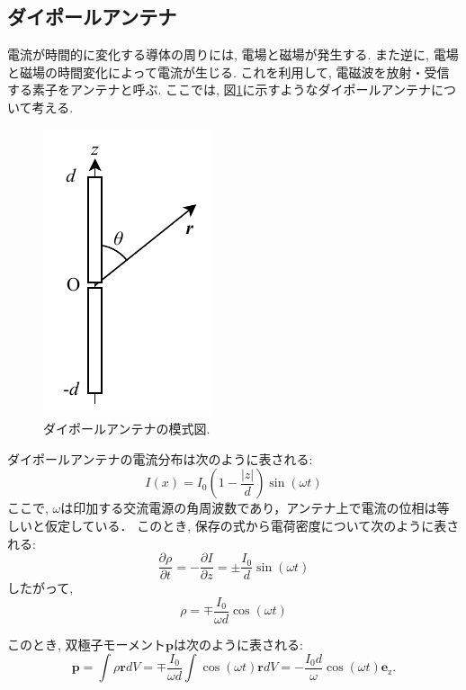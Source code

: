 \documentclass[uplatex,dvipdfmx,a4j,12pt]{jsarticle}
\begin{document}
\subsection{ダイポールアンテナ}
電流が時間的に変化する導体の周りには, 電場と磁場が発生する.
また逆に, 電場と磁場の時間変化によって電流が生じる.
これを利用して, 電磁波を放射・受信する素子をアンテナと呼ぶ.
ここでは, 図\ref{fig:dipole_antenna}に示すようなダイポールアンテナについて考える.
\begin{figure}[h]
    \centering
    \includegraphics[width=0.2\linewidth]{img/dipole_antenna.pdf}
    \caption{ダイポールアンテナの模式図.}
    \label{fig:dipole_antenna}
\end{figure}

ダイポールアンテナの電流分布は次のように表される:
\begin{equation}
    I(x) = I_0 \left(1 - \frac{|z|}{d}\right)\sin\left(\omega t\right)
\end{equation}
ここで, $\omega$は印加する交流電源の角周波数であり，アンテナ上で電流の位相は等しいと仮定している．
このとき, 保存の式から電荷密度について次のように表される:
\begin{equation}
  \frac{\partial \rho}{\partial t}  = - \frac{\partial I}{\partial z} = \pm \frac{I_0}{d}\sin\left(\omega t\right)
\end{equation}
したがって, 
\begin{equation}
  \rho = \mp \frac{I_0}{\omega d}\cos\left(\omega t\right)
\end{equation}

このとき, 双極子モーメント$\mathbf{p}$は次のように表される:
\begin{equation}
  \mathbf{p} = \int \rho \mathbf{r} dV = \mp \frac{I_0}{\omega d}\int \cos\left(\omega t\right) \mathbf{r} dV
  = -\frac{I_0 d}{\omega}\cos\left(\omega t\right) \mathbf{e}_\mathrm{z}.
\end{equation}
\end{document}
